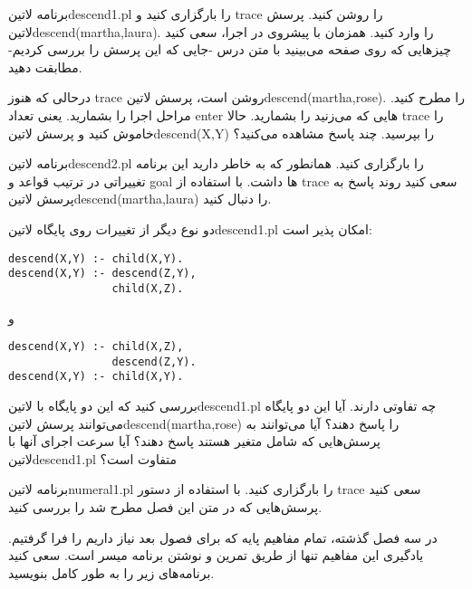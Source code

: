 \begin{enumerate}
 برنامه ‌لاتین{descend1.pl} را بارگزاری کنید و trace را روشن کنید. پرسش ‌لاتین{descend(martha,laura).} را وارد کنید. همزمان با پیشروی در اجرا، سعی کنید چیزهایی که روی صفحه می‌بینید با متن درس -جایی که این پرسش را بررسی کردیم- مطابقت دهید.

 درحالی که هنوز trace روشن است، پرسش ‌لاتین{descend(martha,rose).} را مطرح کنید. مراحل اجرا را بشمارید. یعنی تعداد enter هایی که می‌زنید را بشمارید. حالا trace را خاموش کنید و پرسش ‌لاتین{descend(X,Y)} را بپرسید. چند پاسخ مشاهده می‌کنید؟

 برنامه ‌لاتین{descend2.pl} را بارگزاری کنید. همانطور که به خاطر دارید این برنامه تغییراتی در ترتیب قواعد و goal ها داشت. با استفاده از trace سعی کنید روند پاسخ به پرسش ‌لاتین{descend(martha,laura)} را دنبال کنید.

 دو نوع دیگر از تغییرات روی پایگاه ‌لاتین{descend1.pl} امکان پذیر است:
\begin{latin}
\begin{lstlisting}
descend(X,Y) :- child(X,Y).
descend(X,Y) :- descend(Z,Y),
                child(X,Z).
\end{lstlisting}
\end{latin}
و
\begin{latin}
\begin{lstlisting}
descend(X,Y) :- child(X,Z),
                descend(Z,Y).
descend(X,Y) :- child(X,Y).
\end{lstlisting}
\end{latin}

 بررسی کنید که این دو پایگاه با ‌لاتین{descend1.pl} چه تفاوتی دارند. آیا این دو پایگاه می‌توانند پرسش ‌لاتین{descend(martha,rose)} را پاسخ دهند؟ آیا می‌توانند به پرسش‌هایی که شامل متغیر هستند پاسخ دهند؟ آیا سرعت اجرای آنها با ‌لاتین{descend1.pl} متفاوت است؟

 برنامه ‌لاتین{numeral1.pl} را بارگزاری کنید. با استفاده از دستور trace سعی کنید پرسش‌هایی که در متن این فصل مطرح شد را بررسی کنید.
\end{enumerate}

در سه فصل گذشته، تمام مفاهیم پایه که برای فصول بعد نیاز داریم را فرا گرفتیم. یادگیری این مفاهیم تنها از طریق تمرین و نوشتن برنامه میسر است. سعی کنید برنامه‌های زیر را به طور کامل بنویسید.

